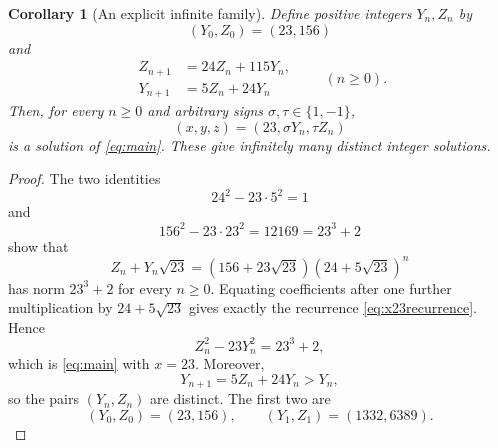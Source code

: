 \documentclass[a4paper,11pt]{amsart}
\numberwithin{equation}{section}
\newtheorem{corollary}[theorem]{Corollary}
\theoremstyle{definition}
\theoremstyle{remark}
\begin{document}
\begin{corollary}[An explicit infinite family]\label{cor:x23}
Define positive integers \(Y_n,Z_n\) by
\begin{equation}\label{eq:x23initial}
 (Y_0,Z_0)=(23,156)
\end{equation}
and
\begin{equation}\label{eq:x23recurrence}
 \begin{aligned}
 Z_{n+1}&=24Z_n+115Y_n,\\
 Y_{n+1}&=5Z_n+24Y_n
 \end{aligned}
 \qquad(n\geq0).
\end{equation}
Then, for every \(n\geq0\) and arbitrary signs
\(\sigma,\tau\in\{1,-1\}\),
\begin{equation}\label{eq:x23solutions}
 (x,y,z)=(23,\sigma Y_n,\tau Z_n)
\end{equation}
is a solution of \eqref{eq:main}.  These give infinitely many distinct
integer solutions.
\end{corollary}

\begin{proof}
The two identities
\begin{equation}\label{eq:x23norms}
 24^2-23\cdot5^2=1
\end{equation}
and
\begin{equation}\label{eq:x23base}
 156^2-23\cdot23^2=12169=23^3+2
\end{equation}
show that
\begin{equation}\label{eq:x23product}
 Z_n+Y_n\sqrt{23}
 =(156+23\sqrt{23})(24+5\sqrt{23})^n
\end{equation}
has norm \(23^3+2\) for every \(n\geq0\).  Equating coefficients after one
further multiplication by \(24+5\sqrt{23}\) gives exactly the recurrence
\eqref{eq:x23recurrence}.  Hence
\begin{equation*}
 Z_n^2-23Y_n^2=23^3+2,
\end{equation*}
which is \eqref{eq:main} with \(x=23\).  Moreover,
\begin{equation*}
 Y_{n+1}=5Z_n+24Y_n>Y_n,
\end{equation*}
so the pairs \((Y_n,Z_n)\) are distinct.  The first two are
\begin{equation*}
 (Y_0,Z_0)=(23,156),
 \qquad
 (Y_1,Z_1)=(1332,6389).
\end{equation*}
\end{proof}
\end{document}
